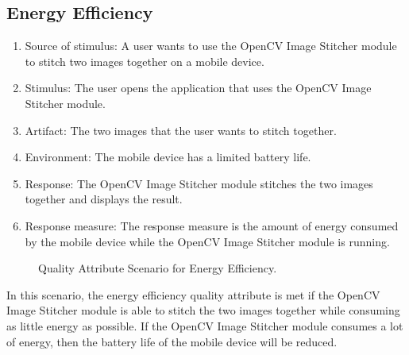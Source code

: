 \subsection{Energy Efficiency\label{subSection::EnergyEfficiencyQA}}
\begin{enumerate}
    \item Source of stimulus: A user wants to use the OpenCV Image Stitcher module to stitch two images together on a mobile device.
    \item Stimulus: The user opens the application that uses the OpenCV Image Stitcher module.
    \item Artifact: The two images that the user wants to stitch together.
    \item Environment: The mobile device has a limited battery life.
    \item Response: The OpenCV Image Stitcher module stitches the two images together and displays the result.
    \item Response measure: The response measure is the amount of energy consumed by the mobile device while the OpenCV Image Stitcher module is running.
\end{enumerate}
\begin{figure}[H]
\centering
{}
\caption{\label{Figure::Quality Attribute Scenario for Energy Efficiency} Quality Attribute Scenario for Energy Efficiency.}
\end{figure}
In this scenario, the energy efficiency quality attribute is met if the OpenCV Image Stitcher module is able to stitch the two images together while consuming as little energy as possible. If the OpenCV Image Stitcher module consumes a lot of energy, then the battery life of the mobile device will be reduced.
